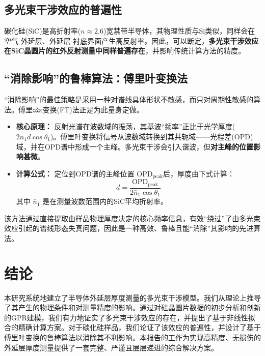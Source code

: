 \documentclass[UTF8, 12pt]{ctexart}
\begin{document}
\subsection{多光束干涉效应的普遍性}
碳化硅(SiC)是高折射率($n \approx 2.6$)宽禁带半导体，其物理性质与Si类似，同样会在空气-外延层、外延层-衬底界面产生高反射率。因此，可以断定，\textbf{多光束干涉效应在SiC晶圆片的红外反射测量中同样普遍存在}，并影响传统计算方法的精度。

\subsection{“消除影响”的鲁棒算法：傅里叶变换法}
“消除影响”的最佳策略是采用一种对谱线具体形状不敏感，而只对周期性敏感的算法。傅里ಯೇ变换(FT)法正是为此量身定做。
\begin{itemize}
    \item \textbf{核心原理：} 反射光谱在波数域的振荡，其基波“频率”正比于光学厚度($2n_1 d \cos\theta_1$)。傅里叶变换将信号从波数域转换到其共轭域——光程差(OPD)域，并在OPD谱中形成一个主峰。多光束干涉会引入谐波，但\textbf{对主峰的位置影响甚微}。
    \item \textbf{计算公式：} 定位到OPD谱的主峰位置 $\text{OPD}_{\text{peak}}$后，厚度由下式计算：
    \begin{equation}
        d = \frac{\text{OPD}_{\text{peak}}}{2 \bar{n}_1 \cos\theta_1}
    \end{equation}
    其中 $\bar{n}_1$ 是在测量波数范围内的SiC平均折射率。
\end{itemize}


该方法通过直接提取由样品物理厚度决定的核心频率信息，有效“绕过”了由多光束效应引起的谱线形态失真问题，因此是一种高效、鲁棒且能“消除”其影响的先进算法。

\section{结论}
本研究系统地建立了半导体外延层厚度测量的多光束干涉模型。我们从理论上推导了其产生的物理条件和对测量精度的影响。通过对硅晶圆片数据的初步分析和创新的GPR建模，我们有力地证实了多光束干涉效应的存在，并提出了基于非线性拟合的精确计算方案。对于碳化硅样品，我们论证了该效应的普遍性，并设计了基于傅里叶变换的鲁棒算法以消除其不利影响。本报告的工作为实现高精度、无损伤的外延层厚度测量提供了一套完整、严谨且层层递进的综合解决方案。
\end{document}
